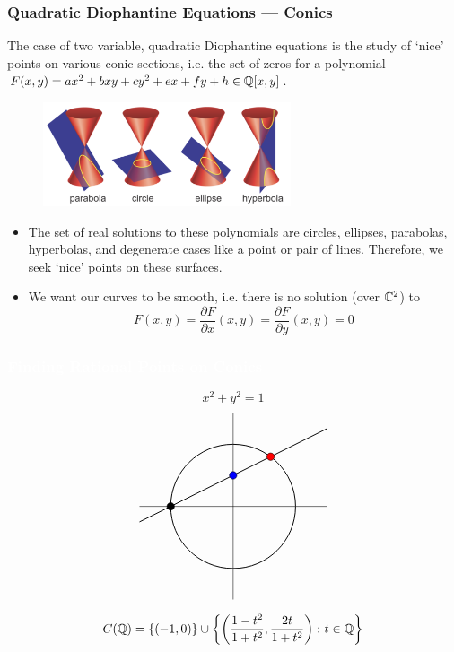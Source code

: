 \begin{frame}[plain] \frametitle{Quadratic Diophantine Equations --- Conics} \small
The case of two variable, quadratic Diophantine equations is the study of `nice' points on various conic sections, i.e. the set of zeros for a polynomial $F(x,y)= ax^2+bxy + cy^2 + ex+fy+h \in \mathbb{Q}[x,y]$. \pspace
	
	\begin{figure}[ht]
	\centering
	\includegraphics[width=0.65\textwidth]{images/conics.png}
	\end{figure}

\begin{itemize}
\item The set of real solutions to these polynomials are circles, ellipses, parabolas, hyperbolas, and degenerate cases like a point or pair of lines. Therefore, we seek `nice' points on these surfaces.

\item We want our curves to be smooth, i.e. there is no solution (over $\mathbb{C}^2$) to
	\[
	F(x,y)= \dfrac{\partial F}{\partial x}(x,y)= \dfrac{\partial F}{\partial y}(x,y)= 0
	\]
\end{itemize}

\end{frame}






\begin{frame}[plain,t]
\frametitle{\textcolor{white}{Finding Rational Points on Conics}}
	\[
	x^2 + y^2 = 1 
	\] \vfill
	\[
	\begin{tikzpicture}[scale=1.75]
	\draw (-1.5,0) -- (1.5,0);
	\draw (0,-1.5) -- (0,1.5);

	\draw[line width=0.7] (-1.5,-0.25) -- (1.5,1.25);
	\draw[line width=0.7] (0,0) circle (1);
	
	\draw[fill=black] (-1,0) circle (0.06);
	\draw[fill=blue] (0,0.5) circle (0.06);
	\draw[fill=red] (0.6,0.8) circle (0.06);
	\end{tikzpicture}
	\] \vfill
	\[
	C(\mathbb{Q})= \{ (-1,0) \} \cup \left\{ \left(\dfrac{1-t^2}{1+t^2}, \dfrac{2t}{1+t^2} \right) \colon t \in \mathbb{Q} \right\}
	\] \pspace
\end{frame}



